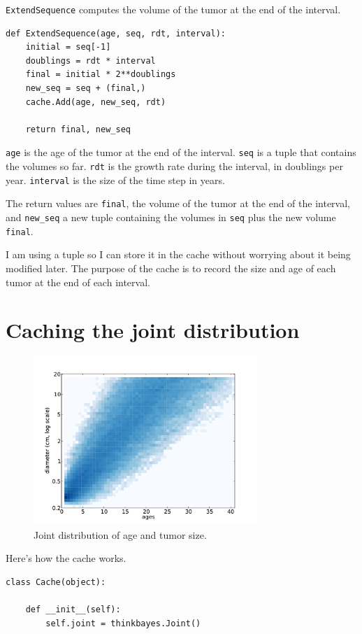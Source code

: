 \documentclass[12pt]{book}
\begin{document}
{\tt ExtendSequence} computes the volume of the tumor at the
end of the interval.

\begin{verbatim}
def ExtendSequence(age, seq, rdt, interval):
    initial = seq[-1]
    doublings = rdt * interval
    final = initial * 2**doublings
    new_seq = seq + (final,)
    cache.Add(age, new_seq, rdt)
    
    return final, new_seq
\end{verbatim}

{\tt age} is the age of the tumor at the end of the interval.
{\tt seq} is a tuple that contains the volumes so far.  {\tt rdt} is
the growth rate during the interval, in doublings per year.
{\tt interval} is the size of the time step in years.

The return values are {\tt final}, the volume of the
tumor at the end of the interval, and \verb"new_seq" a new
tuple containing the volumes in {\tt seq} plus the new volume
{\tt final}.

I am using a tuple so I can store it in the cache without
worrying about it being modified later.  The purpose of the
cache is to record the size and age of each tumor at the end
of each interval.


\section{Caching the joint distribution}

\begin{figure}
\centerline{\includegraphics[height=2.5in]{figs/kidney8.pdf}}
\caption{Joint distribution of age and tumor size.}
\label{fig.kidney8}
\end{figure}


Here's how the cache works.  

\begin{verbatim}
class Cache(object):

    def __init__(self):
        self.joint = thinkbayes.Joint()
\end{verbatim}
\end{document}
